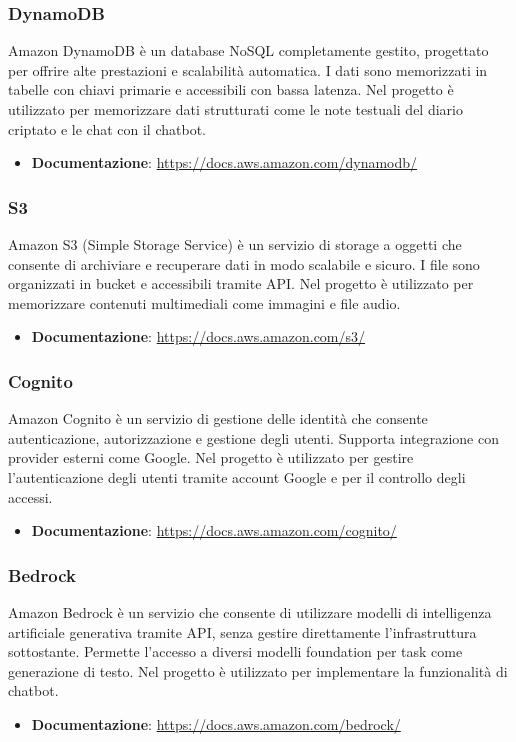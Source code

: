\documentclass[a4paper,12pt]{article}
\begin{document}
\subsubsection{DynamoDB}
Amazon DynamoDB è un database NoSQL completamente gestito, progettato per offrire alte prestazioni e scalabilità automatica. I dati sono memorizzati in tabelle con chiavi primarie e accessibili con bassa latenza. Nel progetto è utilizzato per memorizzare dati strutturati come le note testuali del diario criptato e le chat con il chatbot.
\begin{itemize}
    \item \textbf{Documentazione}: \url{https://docs.aws.amazon.com/dynamodb/}
\end{itemize}

\subsubsection{S3}
Amazon S3 (Simple Storage Service) è un servizio di storage a oggetti che consente di archiviare e recuperare dati in modo scalabile e sicuro. I file sono organizzati in bucket e accessibili tramite API. Nel progetto è utilizzato per memorizzare contenuti multimediali come immagini e file audio.
\begin{itemize}
    \item \textbf{Documentazione}: \url{https://docs.aws.amazon.com/s3/}
\end{itemize}

\subsubsection{Cognito}
Amazon Cognito è un servizio di gestione delle identità che consente autenticazione, autorizzazione e gestione degli utenti. Supporta integrazione con provider esterni come Google. Nel progetto è utilizzato per gestire l'autenticazione degli utenti tramite account Google e per il controllo degli accessi.
\begin{itemize}
    \item \textbf{Documentazione}: \url{https://docs.aws.amazon.com/cognito/}
\end{itemize}

\subsubsection{Bedrock}
Amazon Bedrock è un servizio che consente di utilizzare modelli di intelligenza artificiale generativa tramite API, senza gestire direttamente l'infrastruttura sottostante. Permette l'accesso a diversi modelli foundation per task come generazione di testo. Nel progetto è utilizzato per implementare la funzionalità di chatbot.
\begin{itemize}
    \item \textbf{Documentazione}: \url{https://docs.aws.amazon.com/bedrock/}
\end{itemize}
\end{document}

